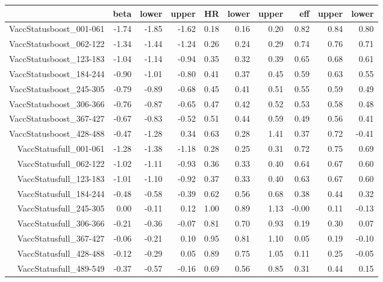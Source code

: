 \begin{table}[ht]
\centering
\begin{tabular}{rrrrrrrrrr}
  \hline
 & beta & lower & upper & HR & lower & upper & eff & upper & lower \\ 
  \hline
VaccStatusboost\_001-061 & -1.74 & -1.85 & -1.62 & 0.18 & 0.16 & 0.20 & 0.82 & 0.84 & 0.80 \\ 
  VaccStatusboost\_062-122 & -1.34 & -1.44 & -1.24 & 0.26 & 0.24 & 0.29 & 0.74 & 0.76 & 0.71 \\ 
  VaccStatusboost\_123-183 & -1.04 & -1.14 & -0.94 & 0.35 & 0.32 & 0.39 & 0.65 & 0.68 & 0.61 \\ 
  VaccStatusboost\_184-244 & -0.90 & -1.01 & -0.80 & 0.41 & 0.37 & 0.45 & 0.59 & 0.63 & 0.55 \\ 
  VaccStatusboost\_245-305 & -0.79 & -0.89 & -0.68 & 0.45 & 0.41 & 0.51 & 0.55 & 0.59 & 0.49 \\ 
  VaccStatusboost\_306-366 & -0.76 & -0.87 & -0.65 & 0.47 & 0.42 & 0.52 & 0.53 & 0.58 & 0.48 \\ 
  VaccStatusboost\_367-427 & -0.67 & -0.83 & -0.52 & 0.51 & 0.44 & 0.59 & 0.49 & 0.56 & 0.41 \\ 
  VaccStatusboost\_428-488 & -0.47 & -1.28 & 0.34 & 0.63 & 0.28 & 1.41 & 0.37 & 0.72 & -0.41 \\ 
  VaccStatusfull\_001-061 & -1.28 & -1.38 & -1.18 & 0.28 & 0.25 & 0.31 & 0.72 & 0.75 & 0.69 \\ 
  VaccStatusfull\_062-122 & -1.02 & -1.11 & -0.93 & 0.36 & 0.33 & 0.40 & 0.64 & 0.67 & 0.60 \\ 
  VaccStatusfull\_123-183 & -1.01 & -1.10 & -0.92 & 0.37 & 0.33 & 0.40 & 0.63 & 0.67 & 0.60 \\ 
  VaccStatusfull\_184-244 & -0.48 & -0.58 & -0.39 & 0.62 & 0.56 & 0.68 & 0.38 & 0.44 & 0.32 \\ 
  VaccStatusfull\_245-305 & 0.00 & -0.11 & 0.12 & 1.00 & 0.89 & 1.13 & -0.00 & 0.11 & -0.13 \\ 
  VaccStatusfull\_306-366 & -0.21 & -0.36 & -0.07 & 0.81 & 0.70 & 0.93 & 0.19 & 0.30 & 0.07 \\ 
  VaccStatusfull\_367-427 & -0.06 & -0.21 & 0.10 & 0.95 & 0.81 & 1.10 & 0.05 & 0.19 & -0.10 \\ 
  VaccStatusfull\_428-488 & -0.12 & -0.29 & 0.05 & 0.89 & 0.75 & 1.05 & 0.11 & 0.25 & -0.05 \\ 
  VaccStatusfull\_489-549 & -0.37 & -0.57 & -0.16 & 0.69 & 0.56 & 0.85 & 0.31 & 0.44 & 0.15 \\ 

\end{tabular}
\end{table}
